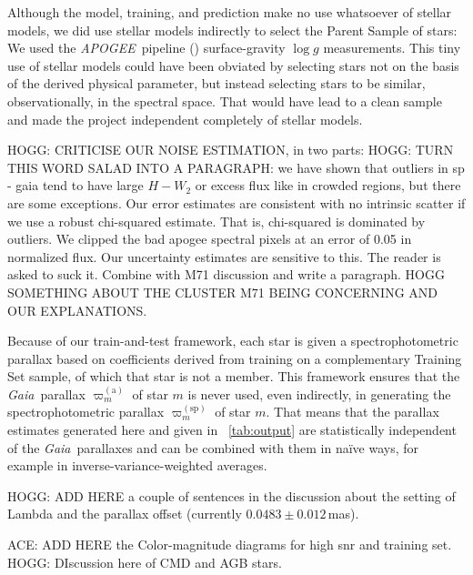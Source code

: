 \documentclass[modern]{aastex62}
\newcommand{\acronym}[1]{{\small{#1}}}
\newcommand{\project}[1]{\textsl{#1}}
\newcommand{\apogee}{\project{\acronym{APOGEE}}}
\newcommand{\gaia}{\project{Gaia}}
\newcommand{\logg}{\log g}
\newcommand{\gparallax}{\varpi^{(\mathrm{a})}}
\newcommand{\sparallax}{\varpi^{(\mathrm{sp})}}
\begin{document}
Although the model, training, and prediction make no use whatsoever of stellar
models, we did use stellar models indirectly to select the Parent Sample of stars:
We used the \apogee\ pipeline (\citealt{aspcap}) surface-gravity $\logg$ measurements.
This tiny use of stellar models could have been obviated by selecting stars not
on the basis of the derived physical parameter, but instead selecting stars to
be similar, observationally, in the spectral space.
That would have lead to a clean sample and made the project independent completely
of stellar models.

HOGG: CRITICISE OUR NOISE ESTIMATION, in two parts:
HOGG: TURN THIS WORD SALAD INTO A PARAGRAPH: we have shown that outliers in sp - gaia tend to have large $H-W_2$ or excess flux like in crowded regions, but there are some exceptions. Our error estimates are consistent with no intrinsic scatter if we use a robust chi-squared estimate. That is, chi-squared is dominated by outliers. We clipped the bad apogee spectral pixels at an error of 0.05 in normalized flux. Our uncertainty estimates are sensitive to this. The reader is asked to suck it. Combine with M71 discussion and write a paragraph.
HOGG SOMETHING ABOUT THE CLUSTER M71 BEING CONCERNING AND OUR EXPLANATIONS.

Because of our train-and-test framework, each star is given a spectrophotometric
parallax based on coefficients derived from training on a complementary Training Set sample, of
which that star is not a member.
This framework ensures that the \gaia\ parallax $\gparallax_m$ of star $m$ is never used,
even indirectly, in generating the spectrophotometric parallax $\sparallax_m$ of star $m$.
That means that the parallax estimates generated here and given in \tablename~\ref{tab:output}
are statistically independent of the \gaia\ parallaxes and can be combined with them in
na\"ive ways, for example in inverse-variance-weighted averages.

HOGG: ADD HERE a couple of sentences in the discussion about the setting of Lambda and the parallax offset (currently $0.0483\pm 0.012$\,mas).

ACE: ADD HERE the Color-magnitude diagrams for high snr and training set.
HOGG: DIscussion here of CMD and AGB stars.
\end{document}

